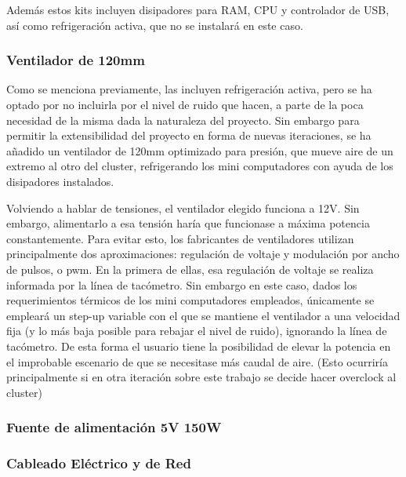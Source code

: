 Además estos kits incluyen disipadores para RAM, CPU y controlador de USB, así como refrigeración activa, que no se instalará en este caso.


\subsubsection{Ventilador de 120mm}
Como se menciona previamente, las  incluyen refrigeración activa, pero se ha optado por no incluirla por el nivel de ruido que hacen, a parte de la poca necesidad de la misma dada la naturaleza del proyecto. Sin embargo para permitir la extensibilidad del proyecto en forma de nuevas iteraciones, se ha añadido un ventilador de 120mm optimizado para presión, que mueve aire de un extremo al otro del cluster, refrigerando los mini computadores con ayuda de los disipadores instalados.

Volviendo a hablar de tensiones, el ventilador elegido funciona a 12V. Sin embargo, alimentarlo a esa tensión haría que funcionase a máxima potencia constantemente. Para evitar esto, los fabricantes de ventiladores utilizan principalmente dos aproximaciones: regulación de voltaje y modulación por ancho de pulsos, o \acrshort{pwm}. En la primera de ellas, esa regulación de voltaje se realiza informada por la línea de tacómetro. Sin embargo en este caso,  dados los requerimientos térmicos de los mini computadores empleados, únicamente se empleará un step-up variable con el que se mantiene el ventilador a una velocidad fija (y lo más baja posible para rebajar el nivel de ruido), ignorando la línea de tacómetro. De esta forma el usuario tiene la posibilidad de elevar la potencia en el improbable escenario de que se necesitase más caudal de aire. (Esto ocurriría principalmente si en otra iteración sobre este trabajo se decide hacer overclock al cluster)


\subsubsection{Fuente de alimentación 5V 150W}


\subsubsection{Cableado Eléctrico y de Red}




